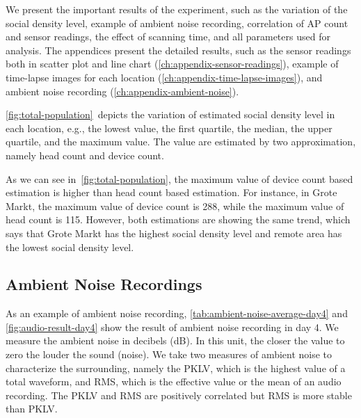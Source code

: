 We present the important results of the experiment, such as the variation of the social density level, example of ambient noise recording, correlation of \ac{AP} count and sensor readings, the effect of scanning time, and all parameters used for analysis. The appendices present the detailed results, such as the sensor readings both in scatter plot and line chart (\autoref{ch:appendix-sensor-readings}), example of time-lapse images for each location (\autoref{ch:appendix-time-lapse-images}), and ambient noise recording (\autoref{ch:appendix-ambient-noise}).

\autoref{fig:total-population}~depicts the variation of estimated social density level in each location, e.g., the lowest value, the first quartile, the median, the upper quartile, and the maximum value. The value are estimated by two approximation, namely head count and device count.

As we can see in~\autoref{fig:total-population}, the maximum value of device count based estimation is higher than head count based estimation. For instance, in Grote Markt, the maximum value of device count is 288, while the maximum value of head count is 115. However, both estimations are showing the same trend, which says that Grote Markt has the highest social density level and remote area has the lowest social density level.













	\subsection{Ambient Noise Recordings} %
	\label{sub:ambient_noise_recordings}
	As an example of ambient noise recording, \autoref{tab:ambient-noise-average-day4} and \autoref{fig:audio-result-day4} show the result of ambient noise recording in day 4. We measure the ambient noise in decibels (dB). In this unit, the closer the value to zero the louder the sound (noise). We take two measures of ambient noise to characterize the surrounding, namely the \ac{PKLV}, which is the highest value of a total waveform, and \ac{RMS}, which is the effective value or the mean of an audio recording. The \ac{PKLV} and \ac{RMS} are positively correlated but \ac{RMS} is more stable than \ac{PKLV}.

